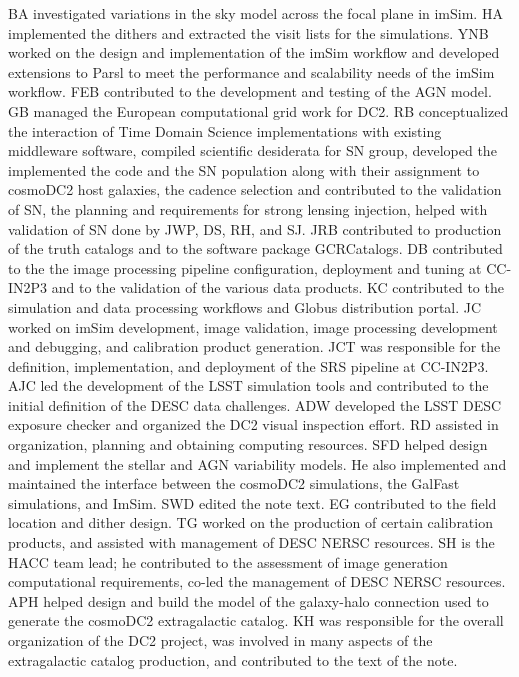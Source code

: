 \documentclass[modern]{descnote}
\begin{document}
BA investigated variations in the sky model across the focal plane in imSim.
%
HA implemented the dithers and extracted the visit lists for the simulations.
%
YNB worked on the design and implementation of the imSim workflow and developed extensions to Parsl to meet the performance and scalability needs of the imSim workflow.
%
FEB contributed to the development and testing of the AGN model.
%
GB managed the European computational grid work for DC2.
%
RB conceptualized the interaction of Time Domain Science implementations with existing middleware software, compiled scientific desiderata for SN group, developed the implemented the code and the SN population along with their assignment to cosmoDC2 host galaxies, the cadence selection and contributed to the validation of SN, the planning and requirements for strong lensing injection, helped with validation of SN done by JWP, DS, RH, and SJ.
%
JRB contributed to production of the truth catalogs and to the software package GCRCatalogs.
%
DB contributed to the the image processing pipeline configuration, deployment and tuning at CC-IN2P3 and to the validation of the various data products.
% 
KC contributed to the simulation and data processing workflows and Globus distribution portal.
%
JC worked on imSim development, image validation, image processing development and debugging, and calibration product generation.
%
JCT was responsible for the definition, implementation, and deployment of the SRS pipeline at CC-IN2P3.
%
AJC led the development of the LSST simulation tools and contributed to the initial definition of the DESC data challenges.
%
ADW developed the LSST DESC exposure checker and organized the DC2 visual inspection effort.
%
RD assisted in organization, planning and obtaining computing resources.
%
SFD helped design and implement the stellar and AGN variability models. He also implemented and maintained the interface between the cosmoDC2 simulations, the GalFast simulations, and ImSim.
%
SWD edited the note text.
%
EG contributed to the field location and dither design.
%
TG worked on the production of certain calibration products, and assisted with management of DESC NERSC resources.
%
SH is the HACC team lead; he contributed to the assessment of image generation computational requirements, co-led the management of DESC NERSC resources.
%
APH helped design and build the model of the galaxy-halo connection used to generate the cosmoDC2 extragalactic catalog. 
%
KH was responsible for the overall organization of the DC2 project, was involved in many aspects of the extragalactic catalog production, and contributed to the text of the note.
\end{document}
